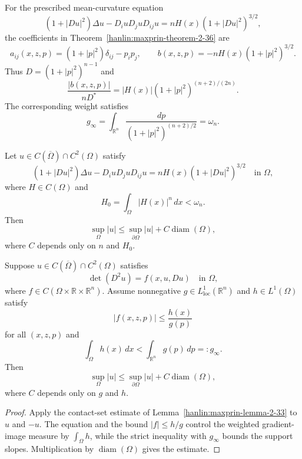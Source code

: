 \begin{example}\label{hanlin:maxprin-example-2-37}


For the prescribed mean-curvature equation
\[
(1+|Du|^2)\Delta u-D_iuD_juD_{ij}u
=nH(x)(1+|Du|^2)^{3/2},
\]
the coefficients in Theorem~\ref{hanlin:maxprin-theorem-2-36} are
\[
a_{ij}(x,z,p)=(1+|p|^2)\delta_{ij}-p_ip_j,
\qquad
b(x,z,p)=-nH(x)(1+|p|^2)^{3/2}.
\]
Thus $D=(1+|p|^2)^{n-1}$ and
\[
\frac{|b(x,z,p)|}{nD^*}
=|H(x)|(1+|p|^2)^{(n+2)/(2n)}.
\]
The corresponding weight satisfies
\[
g_\infty=\int_{\mathbb R^n}\frac{dp}{(1+|p|^2)^{(n+2)/2}}
=\omega_n.
\]
\end{example}

\begin{corollary}\label{hanlin:maxprin-cor-2-38}
Let $u\in C(\overline\Omega)\cap C^2(\Omega)$ satisfy
\[
(1+|Du|^2)\Delta u-D_iuD_juD_{ij}u
=nH(x)(1+|Du|^2)^{3/2}
\quad\text{in }\Omega,
\]
where $H\in C(\Omega)$ and
\[
H_0=\int_\Omega|H(x)|^n\,dx<\omega_n.
\]
Then
\[
\sup_\Omega|u|\le\sup_{\partial\Omega}|u|
+C\operatorname{diam}(\Omega),
\]
where $C$ depends only on $n$ and $H_0$.
\end{corollary}

\begin{theorem}\label{hanlin:maxprin-theorem-2-39}
Suppose $u\in C(\overline\Omega)\cap C^2(\Omega)$ satisfies
\[
\det(D^2u)=f(x,u,Du)
\quad\text{in }\Omega,
\]
where $f\in C(\Omega\times\mathbb R\times\mathbb R^n)$. Assume nonnegative
$g\in L^1_{\mathrm{loc}}(\mathbb R^n)$ and $h\in L^1(\Omega)$ satisfy
\[
|f(x,z,p)|\le\frac{h(x)}{g(p)}
\]
for all $(x,z,p)$ and
\[
\int_\Omega h(x)\,dx
<\int_{\mathbb R^n}g(p)\,dp=:g_\infty.
\]
Then
\[
\sup_\Omega|u|\le\sup_{\partial\Omega}|u|
+C\operatorname{diam}(\Omega),
\]
where $C$ depends only on $g$ and $h$.
\end{theorem}
\begin{proof}
\sketch Apply the contact-set estimate of
Lemma~\ref{hanlin:maxprin-lemma-2-33} to $u$ and $-u$. The equation and the
bound $|f|\le h/g$ control the weighted gradient-image measure by
$\int_\Omega h$, while the strict inequality with $g_\infty$ bounds the support
slopes. Multiplication by $\operatorname{diam}(\Omega)$ gives the estimate.
\end{proof}


